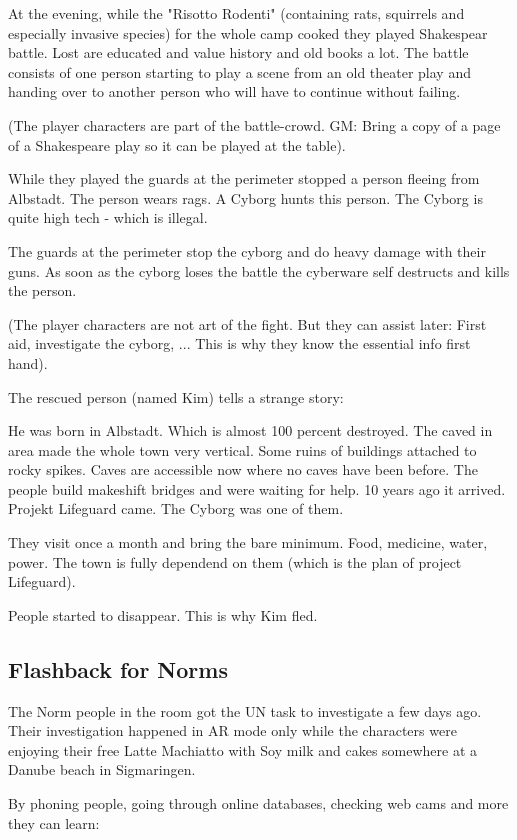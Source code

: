 At the evening, while the "Risotto Rodenti" (containing rats, squirrels and especially invasive species) for the whole camp cooked they played Shakespear battle. Lost are educated and value history and old books a lot. The battle consists of one person starting to play a scene from an old theater play and handing over to another person who will have to continue without failing.

(The player characters are part of the battle-crowd. GM: Bring a copy of a page of a Shakespeare play so it can be played at the table).

While they played the guards at the perimeter stopped a person fleeing from Albstadt. The person wears rags. A Cyborg hunts this person. The Cyborg is quite high tech - which is illegal.

The guards at the perimeter stop the cyborg and do heavy damage with their guns. As soon as the cyborg loses the battle the cyberware self destructs and kills the person.

(The player characters are not art of the fight. But they can assist later: First aid, investigate the cyborg, ... This is why they know the essential info first hand).

The rescued person (named Kim) tells a strange story:

He was born in Albstadt. Which is almost 100 percent destroyed. The caved in area made the whole town very vertical. Some ruins of buildings attached to rocky spikes. Caves are accessible now where no caves have been before. The people build makeshift bridges and were waiting for help. 10 years ago it arrived. Projekt Lifeguard came. The Cyborg was one of them.

They visit once a month and bring the bare minimum. Food, medicine, water, power. The town is fully dependend on them (which is the plan of project Lifeguard).

People started to disappear. This is why Kim fled.

\subsection{Flashback for Norms}

The Norm people in the room got the UN task to investigate a few days ago. Their investigation happened in AR mode only while the characters were enjoying their free Latte Machiatto with Soy milk and cakes somewhere at a Danube beach in Sigmaringen.

By phoning people, going through online databases, checking web cams and more they can learn:

